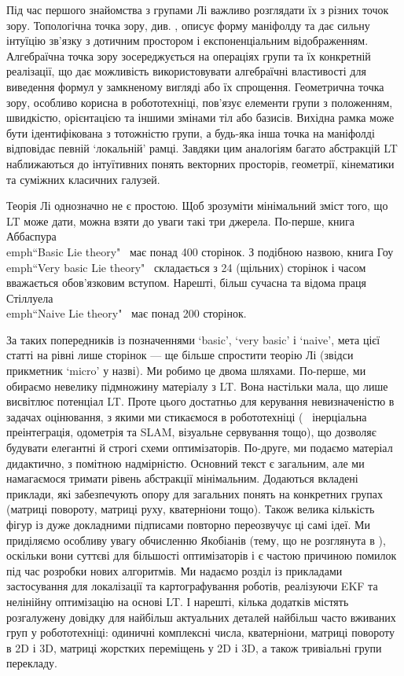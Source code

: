 Під час першого знайомства з групами Лі важливо розглядати їх з різних точок зору.
Топологічна точка зору, див.
, описує форму маніфолду та дає сильну інтуїцію зв'язку з дотичним простором і експоненціальним відображенням.
Алгебраїчна точка зору зосереджується на операціях групи та їх конкретній реалізації, що дає можливість використовувати алгебраїчні властивості для виведення формул у замкненому вигляді або їх спрощення.
Геометрична точка зору, особливо корисна в робототехніці, пов'язує елементи групи з положенням, швидкістю, орієнтацією та іншими змінами тіл або базисів.
Вихідна рамка може бути ідентифікована з тотожністю групи, а будь-яка інша точка на маніфолді відповідає певній `локальній' рамці.
Завдяки цим аналогіям багато абстракцій LT наближаються до інтуїтивних понять векторних просторів, геометрії, кінематики та суміжних класичних галузей.


Теорія Лі однозначно не є простою.
Щоб зрозуміти мінімальний зміст того, що LT може дати, можна взяти до уваги такі три джерела.
По-перше, книга Аббаспура \\emph{``Basic Lie theory"}~\cite{ABBASPOUR-2007-Basic_Lie_theory} має понад 400 сторінок.
З подібною назвою, книга Гоу \\emph{``Very basic Lie theory"}~\cite{Howe-Basic_Lie} складається з 24 (щільних) сторінок і часом вважається обов'язковим вступом.
Нарешті, більш сучасна та відома праця Стіллуела \\emph{``Naive Lie theory"}~\cite{STILLWELL-08} має понад 200 сторінок.

За таких попередників із позначеннями `basic', `very basic' і `naive', мета цієї статті на рівні лише 
\pageref{LastPage} сторінок — ще більше спростити теорію Лі (звідси прикметник `micro' у назві).
Ми робимо це двома шляхами.
По-перше, ми обираємо невелику підмножину матеріалу з LT.
Вона настільки мала, що лише висвітлює потенціал LT.
Проте цього достатньо для керування невизначеністю в задачах оцінювання, з якими ми стикаємося в робототехніці (
\eg~інерціальна преінтеграція, одометрія та SLAM, візуальне сервування тощо), що дозволяє будувати елегантні й строгі схеми оптимізаторів.
По-друге, ми подаємо матеріал дидактично, з помітною надмірністю.
Основний текст є загальним, але ми намагаємося тримати рівень абстракції мінімальним.
Додаються вкладені приклади, які забезпечують опору для загальних понять на конкретних групах (матриці повороту, матриці руху, кватерніони тощо).
Також велика кількість фігур із дуже докладними підписами повторно переозвучує ці самі ідеї.
Ми приділяємо особливу увагу обчисленню Якобіанів (тему, що не розглянута в 
\cite{STILLWELL-08}), оскільки вони суттєві для більшості оптимізаторів і є частою причиною помилок під час розробки нових алгоритмів.
Ми надаємо розділ із прикладами застосування для локалізації та картографування роботів, реалізуючи EKF та нелінійну оптимізацію на основі LT.
І нарешті, кілька додатків містять розгалужену довідку для найбільш актуальних деталей найбільш часто вживаних груп у робототехніці: одиничні комплексні числа, кватерніони, матриці повороту в 2D і 3D, матриці жорстких переміщень у 2D і 3D, а також тривіальні групи перекладу.

